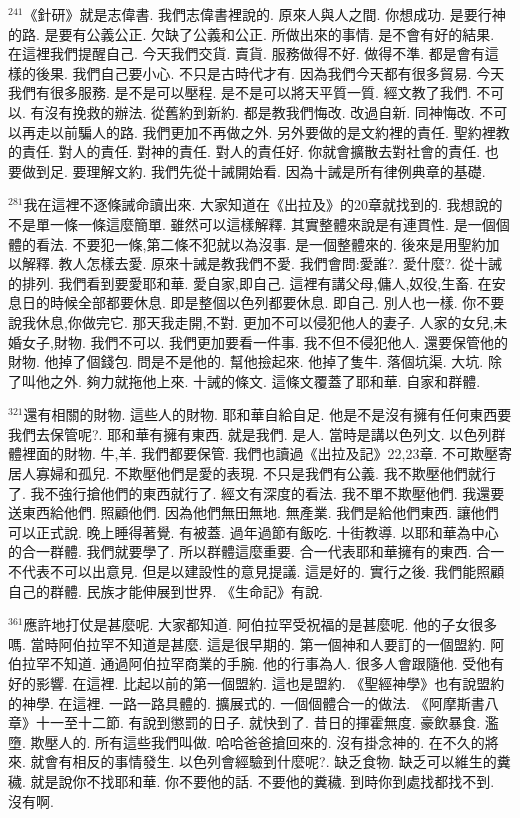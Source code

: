 \documentclass{book}
\begin{document}
$^{241}$《針研》就是志偉書.
我們志偉書裡說的.
原來人與人之間.
你想成功.
是要行神的路.
是要有公義公正.
欠缺了公義和公正.
所做出來的事情.
是不會有好的結果.
在這裡我們提醒自己.
今天我們交貨.
賣貨.
服務做得不好.
做得不準.
都是會有這樣的後果.
我們自己要小心.
不只是古時代才有.
因為我們今天都有很多貿易.
今天我們有很多服務.
是不是可以壓程.
是不是可以將天平質一質.
經文教了我們.
不可以.
有沒有挽救的辦法.
從舊約到新約.
都是教我們悔改.
改過自新.
同神悔改.
不可以再走以前騙人的路.
我們更加不再做之外.
另外要做的是文約裡的責任.
聖約裡教的責任.
對人的責任.
對神的責任.
對人的責任好.
你就會擴散去對社會的責任.
也要做到足.
要理解文約.
我們先從十誡開始看.
因為十誡是所有律例典章的基礎.

$^{281}$我在這裡不逐條誡命讀出來.
大家知道在《出拉及》的20章就找到的.
我想說的不是單一條一條這麼簡單.
雖然可以這樣解釋.
其實整體來說是有連貫性.
是一個個體的看法.
不要犯一條,第二條不犯就以為沒事.
是一個整體來的.
後來是用聖約加以解釋.
教人怎樣去愛.
原來十誡是教我們不愛.
我們會問:愛誰?.
愛什麼?.
從十誡的排列.
我們看到要愛耶和華.
愛自家,即自己.
這裡有講父母,傭人,奴役,生畜.
在安息日的時候全部都要休息.
即是整個以色列都要休息.
即自己.
別人也一樣.
你不要說我休息,你做完它.
那天我走開,不對.
更加不可以侵犯他人的妻子.
人家的女兒,未婚女子,財物.
我們不可以.
我們更加要看一件事.
我不但不侵犯他人.
還要保管他的財物.
他掉了個錢包.
問是不是他的.
幫他撿起來.
他掉了隻牛.
落個坑渠.
大坑.
除了叫他之外.
夠力就拖他上來.
十誡的條文.
這條文覆蓋了耶和華.
自家和群體.

$^{321}$還有相關的財物.
這些人的財物.
耶和華自給自足.
他是不是沒有擁有任何東西要我們去保管呢?.
耶和華有擁有東西.
就是我們.
是人.
當時是講以色列文.
以色列群體裡面的財物.
牛,羊.
我們都要保管.
我們也讀過《出拉及記》22,23章.
不可欺壓寄居人寡婦和孤兒.
不欺壓他們是愛的表現.
不只是我們有公義.
我不欺壓他們就行了.
我不強行搶他們的東西就行了.
經文有深度的看法.
我不單不欺壓他們.
我還要送東西給他們.
照顧他們.
因為他們無田無地.
無產業.
我們是給他們東西.
讓他們可以正式說.
晚上睡得著覺.
有被蓋.
過年過節有飯吃.
十街教導.
以耶和華為中心的合一群體.
我們就要學了.
所以群體這麼重要.
合一代表耶和華擁有的東西.
合一不代表不可以出意見.
但是以建設性的意見提議.
這是好的.
實行之後.
我們能照顧自己的群體.
民族才能伸展到世界.
《生命記》有說.

$^{361}$應許地打仗是甚麼呢.
大家都知道.
阿伯拉罕受祝福的是甚麼呢.
他的子女很多嗎.
當時阿伯拉罕不知道是甚麼.
這是很早期的.
第一個神和人要訂的一個盟約.
阿伯拉罕不知道.
通過阿伯拉罕商業的手腕.
他的行事為人.
很多人會跟隨他.
受他有好的影響.
在這裡.
比起以前的第一個盟約.
這也是盟約.
《聖經神學》也有說盟約的神學.
在這裡.
一路一路具體的.
擴展式的.
一個個體合一的做法.
《阿摩斯書八章》十一至十二節.
有說到懲罰的日子.
就快到了.
昔日的揮霍無度.
豪飲暴食.
濫墮.
欺壓人的.
所有這些我們叫做.
哈哈爸爸搶回來的.
沒有掛念神的.
在不久的將來.
就會有相反的事情發生.
以色列會經驗到什麼呢?.
缺乏食物.
缺乏可以維生的糞穢.
就是說你不找耶和華.
你不要他的話.
不要他的糞穢.
到時你到處找都找不到.
沒有啊.
\end{document}
